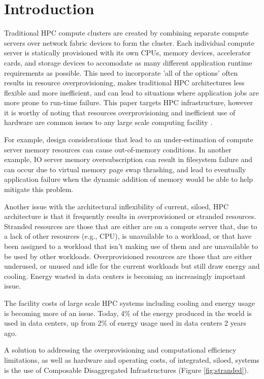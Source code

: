 \section{Introduction}

Traditional HPC compute clusters are created by combining separate compute servers over network fabric devices to form the cluster.  Each individual compute server is statically provisioned with its own CPUs, memory devices, accelerator cards, and storage devices to accomodate as many different application runtime requirements as possible\cite{beowulf}. This need to incorporate 'all of the options' often results in resource overprovisioning, makes traditional HPC architectures less flexible and more inefficient, and can lead to situations where application jobs are more prone to run-time failure. This paper targets HPC infrastructure, however it is worthy of noting that resources overprovisioning and inefficient use of hardware are common issues to any large scale computing facility \cite{borg-google, pond}.

For example, design considerations that lead to an under-estimation of compute server memory resources can cause out-of-memory conditions. In another example, IO server memory oversubscription can result in filesystem failure and can occur due to virtual memory page swap thrashing, and lead to eventually application failure when the dynamic addition of memory would be able to help mitigate this problem.  

Another issue with the architectural inflexibility of current, siloed, HPC architecture is that it frequently results in overprovisioned or stranded resources. Stranded resources are those that are either are on a compute server that, due to a lack of other resources (e.g., CPU), is unavailable to a workload, or that have been assigned to a workload that isn't making use of them and are unavailable to be used by other workloads. Overprovisioned resources are those that are either underused, or unused and idle for the current workloads but still draw energy and cooling. Energy wasted in data centers is becoming an increasingly important issue\cite{eere}.

The facility costs of large scale HPC systems including cooling and energy usage is becoming more of an issue. Today, 4\% of the energy produced in the world is used in data centers, up from 2\% of energy usage used in data centers 2 years ago\cite{dw,vmware}. 

A solution to addressing the overprovisioning and computational efficiency limitations, as well as hardware and operating costs, of integrated, siloed, systems is the use of Composable Disaggregated Infrastructures (Figure \ref{fig:stranded}).

